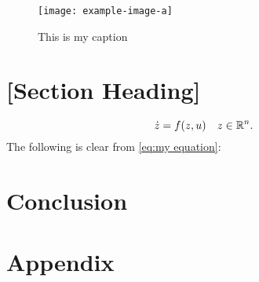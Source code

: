 \begin{figure}[htbp]
    \centering
    \texttt{[image: example-image-a]}
    \caption{This is my caption}
    \label{fig:this is a figure}
\end{figure}

\lipsum[7]

\section{[Section Heading]}

\lipsum[9]
\begin{equation}
    \label{eq:my equation}
    \dot z = f(z,u) \quad z \in \mathbb{R}^n.
\end{equation}
The following is clear from \cref{eq:my equation}:
\lipsum[10-11]

\section{Conclusion}
\label{sec:conclusion}
\lipsum[12]


\nocite{knuth:ct:a}
\nocite{glashow}
\nocite{aristotle:physics}
\nocite{moore}
\nocite{salam}
\nocite{ctan}
\nocite{loh}
\printbibliography

\appendix
\section{Appendix}
\label{sec:appendix}

\lipsum[1]